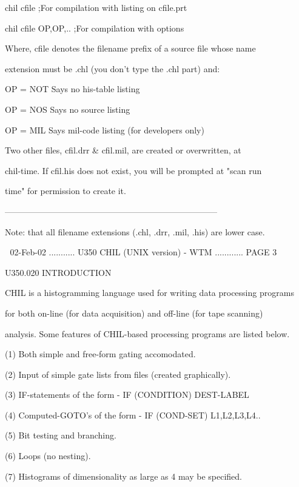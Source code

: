  
   chil cfile              ;For compilation with listing on cfile.prt
 
 
 
   chil cfile OP,OP,..     ;For compilation with options
 
 
 
 
   Where, cfile denotes the filename  prefix  of  a  source  file  whose  name
 
   extension must be .chl (you don't type the .chl part) and:
 
 
   OP = NOT  Says no his-table listing
 
   OP = NOS  Says no source    listing
 
   OP = MIL  Says mil-code listing (for developers only)
 
 
   Two  other  files,  cfil.drr  &  cfil.mil,  are  created or overwritten, at
 
   chil-time. If cfil.his does not exist, you will be prompted  at  "scan  run
 
   time" for permission to create it.
 
 
   ---------------------------------------------------------------------------
 
 
   Note: that all filename extensions (.chl, .drr, .mil, .his) are lower case.
 
    
   02-Feb-02 ........... U350  CHIL (UNIX version) - WTM ............ PAGE   3
 
 
 
   U350.020  INTRODUCTION
 
   CHIL  is a histogramming language used for writing data processing programs
 
   for both on-line (for data acquisition) and off-line  (for  tape  scanning)
 
   analysis. Some features of CHIL-based processing programs are listed below.
 
 
   (1)  Both simple and free-form gating accomodated.
 
   (2)  Input of simple gate lists from files (created graphically).
 
   (3)  IF-statements   of the form - IF (CONDITION) DEST-LABEL
 
   (4)  Computed-GOTO's of the form - IF (COND-SET)  L1,L2,L3,L4..
 
   (5)  Bit testing and branching.
 
   (6)  Loops (no nesting).
 
   (7)  Histograms of dimensionality as large as 4 may be specified.
 
